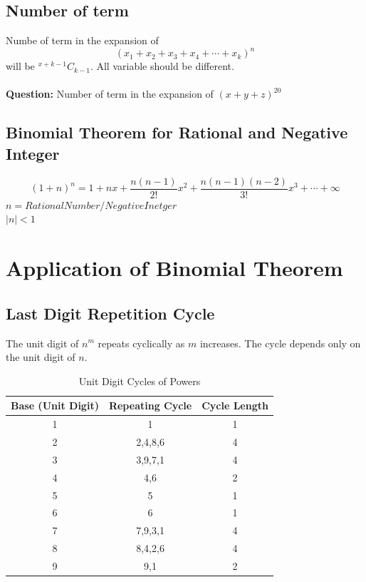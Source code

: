 \documentclass[12pt]{article}
\begin{document}
\subsection{Number of term}
Numbe of term in the expansion of \[
\left(
    x_1+
    x_2+
    x_3+
    x_4+ \cdots+
    x_k
\right)^n
\]
will be ${}^{x+k-1}C_{k-1}$. All variable should be different.\\
\\
\textbf{Question: }Number of term in the expansion of $(x+y+z)^{20}$ \\
\subsection{Binomial Theorem for Rational and Negative Integer}
\[
(1+n)^n = 1+ nx + \frac{n(n-1)}{2!}x^2+\frac{n(n-1)(n-2)}{3!}x^3+\cdots+\infty
\]
$n = Rational Number/Negative Inetger$ \\
$|n|<1$
\newpage
\section{Application of Binomial Theorem}
\subsection{Last Digit Repetition Cycle}

The unit digit of $n^m$ repeats cyclically as $m$ increases. 
The cycle depends only on the unit digit of $n$.

\begin{table}[h]
\centering
\begin{tabular}{|c|c|c|}
\hline
Base (Unit Digit) & Repeating Cycle & Cycle Length \\
\hline
1 & 1 & 1 \\
2 & 2,4,8,6 & 4 \\
3 & 3,9,7,1 & 4 \\
4 & 4,6 & 2 \\
5 & 5 & 1 \\
6 & 6 & 1 \\
7 & 7,9,3,1 & 4 \\
8 & 8,4,2,6 & 4 \\
9 & 9,1 & 2 \\
\hline
\end{tabular}
\caption{Unit Digit Cycles of Powers}
\end{table}
\end{document}
